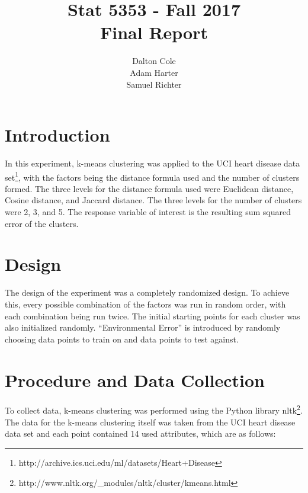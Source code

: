 \documentclass[times]{article}
\begin{document}
   \title{Stat 5353  - Fall 2017 \\ Final Report}
   \author{Dalton Cole \\ Adam Harter \\ Samuel Richter}
   \date{}
   \maketitle
   
   \section{Introduction}

   In this experiment, k-means clustering was applied to the UCI heart disease data 
   set\footnote{http://archive.ics.uci.edu/ml/datasets/Heart+Disease}, with the factors 
   being the distance formula used and the number of clusters formed.  
   The three levels for the distance formula used were Euclidean distance, 
   Cosine distance, and Jaccard distance.  
   The three levels for the number of clusters were 2, 3, and 5.  
   The response variable of interest is the resulting sum squared error of the clusters.

   \section{Design}

   The design of the experiment was a completely randomized design.
   To achieve this, every possible combination of the factors was run in random order,
   with each combination being run twice.
   The initial starting points for each cluster was also initialized randomly.
   ``Environmental Error'' is introduced by randomly choosing data points to train on and
   data points to test against.

   \section{Procedure and Data Collection}

   To collect data, k-means clustering was performed using the Python library
   nltk\footnote{http://www.nltk.org/\_modules/nltk/cluster/kmeans.html}.
   The data for the k-means clustering itself was taken from the UCI heart disease
   data set and each point contained 14 used attributes, which are as follows:
\end{document}
